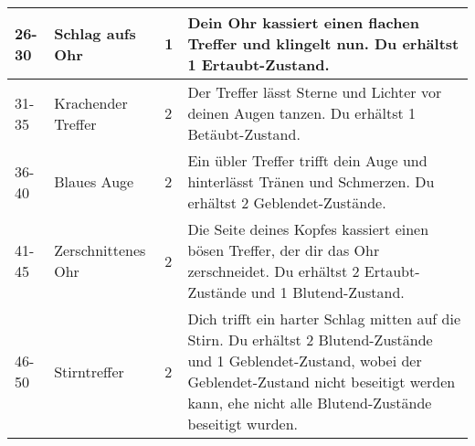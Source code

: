 \documentclass[a4paper, fontsize=8.5pt]{scrartcl}
\begin{document}
\begin{table}[!ht]
\begin{tabularx}{\textwidth}{lp{2.5cm}lX}
        26-30         & Schlag aufs Ohr         & 1           & Dein Ohr kassiert einen flachen Treffer und klingelt nun. Du erhältst 1 Ertaubt-Zustand.                                                                                                                                                                                                                                                                                                                                                      \\ \hline
        31-35         & Krachender Treffer      & 2           & Der Treffer lässt Sterne und Lichter vor deinen Augen tanzen. Du erhältst 1 Betäubt-Zustand.                                                                                                                                                                                                                                                                                                                                                  \\ \hline
        36-40         & Blaues Auge             & 2           & Ein übler Treffer trifft dein Auge und hinterlässt Tränen und Schmerzen. Du erhältst 2 Geblendet-Zustände.                                                                                                                                                                                                                                                                                                                                    \\ \hline
        41-45         & Zerschnittenes Ohr      & 2           & Die Seite deines Kopfes kassiert einen bösen Treffer, der dir das Ohr zerschneidet. Du erhältst 2 Ertaubt-Zustände und 1 Blutend-Zustand.                                                                                                                                                                                                                                                                                                     \\ \hline
        46-50         & Stirntreffer            & 2           & Dich trifft ein harter Schlag mitten auf die Stirn. Du erhältst 2 Blutend-Zustände und 1 Geblendet-Zustand, wobei der Geblendet-Zustand nicht beseitigt werden kann, ehe nicht alle Blutend-Zustände beseitigt wurden.                                                                                                                                                                                                                        \\ \hline

\end{tabularx}
\end{table}
\end{document}
